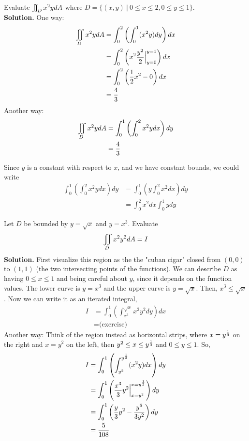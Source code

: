 \documentclass[english, 11pt]{article}
\begin{document}
\begin{exmp}
  Evaluate $\iint\displaylimits_D x^2 y dA$ where $D = \{(x,y) \ | \ 0 \leq x \leq 2, 0 \leq y \leq 1 \}$. \\

  \textbf{Solution.} One way:
  \begin{align*}
    \iint\displaylimits_D x^2y dA & =  \int_0^2 \left( \int_0^1 (x^2y) dy\right)dx \\
                    & = \int_0^2 \left( x^2 \frac{y^2}{2} \Big|_{y=0}^{y=1} \right) dx \\
                    & = \int_0^2 \left( \frac{1}{2}x^2 - 0 \right) dx \\
                    & = \frac{4}{3}
  \end{align*}
  Another way:
  \begin{align*}
    \iint\displaylimits_D x^2y dA & = \int_0^1 \left( \int_0^2 x^2y dx \right) dy \\
                    & = \frac{4}{3}
  \end{align*}
  \begin{note}Since $y$ is a constant with respect to $x$, and we have constant bounds, we could write
  \begin{align*}
    \int_0^1 \left( \int_0^2 x^2y dx \right) dy & = \int_0^1 \left( y \int_0^2 x^2 dx \right) dy \\
    & = \int_0^2 x^2 dx \int_0^1 y dy
  \end{align*}
  \end{note}
\end{exmp}

\begin{exmp} Let $D$ be bounded by $y = \sqrt{x}$ and $y = x^3$. Evaluate
\[ \iint\displaylimits_D x^2 y^2 dA = I \]
\textbf{Solution.} First visualize this region as the the "cuban cigar" closed from $(0,0)$ to $(1,1)$ (the two intersecting points of the functions). We can describe $D$ as having $0 \leq x \leq 1$ and being careful about $y$, since it depends on the function values. The lower curve is $y = x^3$ and the upper curve is $y = \sqrt{x}$. Then, $x^3 \leq \sqrt{x}$. Now we can write it as an iterated integral,
\begin{align*}
  I & = \int_0^1 \left( \int_{x^3}^{\sqrt{x}} x^2y^2 dy \right) dx \\
    & = \mbox{(exercise)}
\end{align*}
Another way: Think of the region instead as horizontal strips, where $x = y^{\frac{1}{3}}$ on the right and $x = y^2$ on the left, then $y^2 \leq x \leq y^{\frac{1}{3}}$ and $0 \leq y \leq 1$. So,
\begin{align*}
  I & = \int_0^1 \left( \int_{y^2}^{y^{\frac{1}{3}}} (x^2 y) dx \right) dy \\
    & = \int_0^1 \left( \frac{x^3}{3} y^2 \Big|_{x = y^2}^{x = y^{\frac{1}{3}}} \right) dy \\
    & = \int_0^1 \left( \frac{y}{3}y^2 - \frac{y^6}{3y^2} \right) dy \\
    & = \frac{5}{108}
\end{align*}
\end{exmp}
\end{document}

